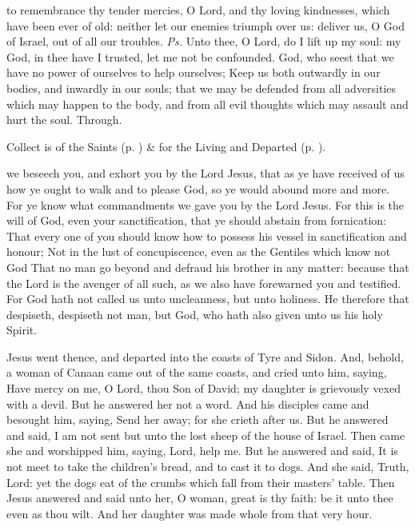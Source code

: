 \introit
{} to remembrance thy tender mercies, O Lord, and thy loving kindnesses, which have been ever of old: neither let our enemies triumph over us: deliver us, O God of Israel, out of all our troubles. \textit{Ps.} Unto thee, O Lord, do I lift up my soul: my God, in thee have I trusted, let me not be confounded.
\collect
{} God, who seest that we have no power of ourselves to help ourselves; Keep us both outwardly in our bodies, and inwardly in our souls; that we may be defended from all adversities which may happen to the body, and from all evil thoughts which may assault and hurt the soul. Through.
\begin{rubric}
     Collect is of the Saints (p. \pageref{SPSaints}) \&  for the Living and Departed (p. \pageref{SPLivingDeparted}).
\end{rubric}
 we beseech you, and exhort you by the Lord Jesus, that as ye have received of us how ye ought to walk and to please God, so ye would abound more and more. For ye know what commandments we gave you by the Lord Jesus. For this is the will of God, even your sanctification, that ye should abstain from fornication: That every one of you should know how to possess his vessel in sanctification and honour; Not in the lust of concupiscence, even as the Gentiles which know not God That no man go beyond and defraud his brother in any matter: because that the Lord is the avenger of all such, as we also have forewarned you and testified. For God hath not called us unto uncleanness, but unto holiness. He therefore that despiseth, despiseth not man, but God, who hath also given unto us his holy Spirit.


 Jesus went thence, and departed into the coasts of Tyre and Sidon. And, behold, a woman of Canaan came out of the same coasts, and cried unto him, saying, Have mercy on me, O Lord, thou Son of David; my daughter is grievously vexed with a devil. But he answered her not a word. And his disciples came and besought him, saying, Send her away; for she crieth after us. But he answered and said, I am not sent but unto the lost sheep of the house of Israel. Then came she and worshipped him, saying, Lord, help me. But he answered and said, It is not meet to take the children's bread, and to cast it to dogs. And she said, Truth, Lord: yet the dogs eat of the crumbs which fall from their masters' table. Then Jesus answered and said unto her, O woman, great is thy faith: be it unto thee even as thou wilt. And her daughter was made whole from that very hour.

